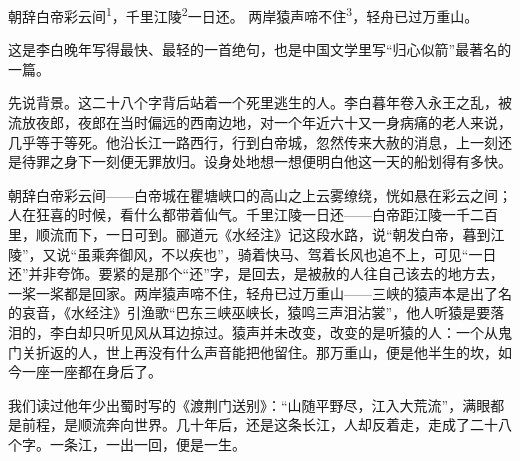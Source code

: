 
\begin{poem}
朝辞白帝彩云间\textsuperscript{1}，千里江陵\textsuperscript{2}一日还。
两岸猿声啼不住\textsuperscript{3}，轻舟已过万重山。
\end{poem}

\begin{annotations}
\end{annotations}

\begin{appreciation}
这是李白晚年写得最快、最轻的一首绝句，也是中国文学里写“归心似箭”最著名的一篇。

先说背景。这二十八个字背后站着一个死里逃生的人。李白暮年卷入永王之乱，被流放夜郎，夜郎在当时偏远的西南边地，对一个年近六十又一身病痛的老人来说，几乎等于等死。他沿长江一路西行，行到白帝城，忽然传来大赦的消息，上一刻还是待罪之身下一刻便无罪放归。设身处地想一想便明白他这一天的船划得有多快。

朝辞白帝彩云间——白帝城在瞿塘峡口的高山之上云雾缭绕，恍如悬在彩云之间；人在狂喜的时候，看什么都带着仙气。千里江陵一日还——白帝距江陵一千二百里，顺流而下，一日可到。郦道元《水经注》记这段水路，说“朝发白帝，暮到江陵”，又说“虽乘奔御风，不以疾也”，骑着快马、驾着长风也追不上，可见“一日还”并非夸饰。要紧的是那个“还”字，是回去，是被赦的人往自己该去的地方去，一桨一桨都是回家。两岸猿声啼不住，轻舟已过万重山——三峡的猿声本是出了名的哀音，《水经注》引渔歌“巴东三峡巫峡长，猿鸣三声泪沾裳”，他人听猿是要落泪的，李白却只听见风从耳边掠过。猿声并未改变，改变的是听猿的人：一个从鬼门关折返的人，世上再没有什么声音能把他留住。那万重山，便是他半生的坎，如今一座一座都在身后了。

我们读过他年少出蜀时写的《渡荆门送别》：“山随平野尽，江入大荒流”，满眼都是前程，是顺流奔向世界。几十年后，还是这条长江，人却反着走，走成了二十八个字。一条江，一出一回，便是一生。
\end{appreciation}
